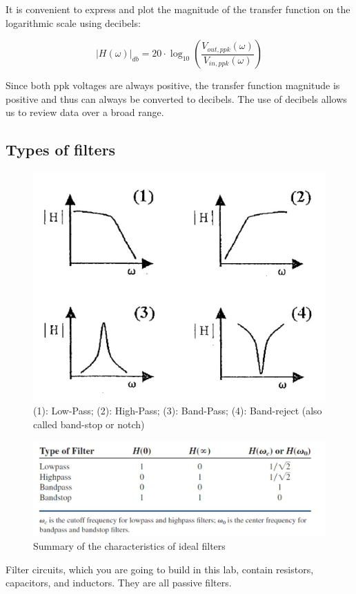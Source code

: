 \documentclass{article}
\begin{document}
It is convenient to express and plot the magnitude of the transfer function on the logarithmic scale using decibels:

$$|H(\omega)|_{db}=20\cdot\log_10\left(\frac{V_{out,ppk}(\omega)}{V_{in,ppk}(\omega)}\right)$$

Since both ppk voltages are always positive, the transfer function magnitude is positive and thus can always be converted to decibels. The use of decibels allows us to review data over a broad range.
\newpage
\subsection{Types of filters}


  \begin{figure}[H]
  \centering
  \includegraphics[width=.6\textwidth]{Figure1.jpg}
  \caption{(1): Low-Pass; (2): High-Pass; (3): Band-Pass; (4): Band-reject (also called band-stop or notch)}
  \label{img} 
\end{figure}

  \begin{figure}[H]
  \centering
  \includegraphics[width=.6\textwidth]{Figure2.jpg}
  \caption{Summary of the characteristics of ideal filters}
  \label{img} 
\end{figure}

Filter circuits, which you are going to build in this lab, contain resistors, capacitors, and inductors. They are all passive filters.
\end{document}
